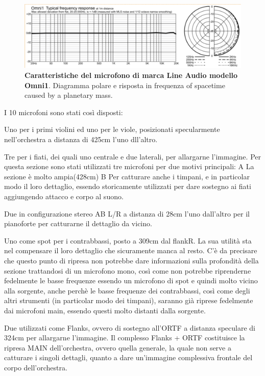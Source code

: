 \begin{figure}[b]
	\begin{center}
		\includegraphics[width=.47\textwidth]{img/image1.png}
		\caption{\textbf{Caratteristiche del microfono di marca Line Audio modello Omni1}. Diagramma polare e risposta in frequenza
			of spacetime caused by a planetary mass.}
		\label{gr01}
	\end{center}
\end{figure}

I 10 microfoni sono stati così disposti:

Uno per i primi violini ed uno per le viole, posizionati specularmente nell'orchestra a distanza di 425cm l'uno dll'altro.

Tre per i fiati, dei quali uno centrale e due laterali, per allargarne l'immagine. Per questa sezione sono stati utilizzati tre microfoni per due motivi principali:
A La sezione è molto ampia(428cm)
B Per catturare anche i timpani, e in particolar modo il loro dettaglio, essendo storicamente utilizzati per dare sostegno ai fiati aggiungendo attacco e corpo al  suono.

Due in configurazione stereo AB L/R a distanza di 28cm l'uno dall'altro per il pianoforte per catturarne il dettaglio da vicino.

Uno come spot per i contrabbassi, posto a 309cm dal flankR. La sua utilità sta nel compensare il loro dettaglio che sicuramente manca al resto. C'è da precisare che questo punto di ripresa non potrebbe dare informazioni sulla profondità della sezione trattandosi di un microfono mono, così come non potrebbe riprenderne fedelmente le basse frequenze essendo un microfono di spot e quindi molto vicino alla sorgente, anche perchè le basse frequenze dei contrabbassi, così come degli altri strumenti (in particolar modo dei timpani), saranno già riprese fedelmente dai microfoni main, essendo questi molto distanti dalla sorgente.

Due utilizzati come Flanks, ovvero di sostegno all'ORTF a distanza speculare di 324cm per allargarne l'immagine. Il complesso Flanks + ORTF costituisce la ripresa MAIN dell'orchestra, ovvero quella generale, la quale non serve a catturare i singoli dettagli, quanto a dare un'immagine complessiva frontale del corpo dell'orchestra.


